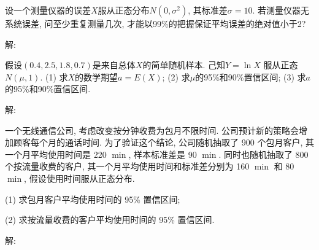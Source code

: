 \documentclass[standard]{ExBook}
\begin{document}
\begin{qitems}
\vspace{-5em}

    \begin{bbox}
    \begin{shaded}
        \qitem
设一个测量仪器的误差$X$服从正态分布$N(0,\sigma^2)$, 其标准差$\sigma = 10$. 若测量仪器无系统误差, 问至少重复测量几次, 才能以99\%的把握保证平均误差的绝对值小于2?
    \end{shaded}
    \end{bbox}

\vspace{-5em}

    \begin{bbox}
解: 
    \end{bbox}

\vspace{-5em}

    \begin{bbox}
    \begin{shaded}
        \qitem
假设$(0.4,2.5,1.8,0.7)$是来自总体$X$的简单随机样本. 己知$Y = \ln X$ 服从正态$N(\mu,1)$.
(1) 求$X$的数学期望$a = E(X)$;
(2) 求$\mu$的95\%和90\%置信区间;
(3) 求$a$的95\%和90\%置信区间.
    \end{shaded}
    \end{bbox}

\vspace{-5em}

    \begin{bbox}
解: 
    \end{bbox}

\vspace{-5em}

    \begin{bbox}
    \begin{shaded}
        \qitem
一个无线通信公司, 考虑改变按分钟收费为包月不限时间. 公司预计新的策略会增加顾客每个月的通话时间. 为了验证这个结论, 公司随机抽取了 900 个包月客户, 其一个月平均使用时间是 220 $\min$, 样本标准差是 90 $\min$. 同时也随机抽取了 800 个按流量收费的客户, 其一个月平均使用时间和标准差分别为 160 $\min$ 和 80 $\min$, 假设使用时间服从正态分布.

(1) 求包月客户平均使用时间的 95\% 置信区间;

(2) 求按流量收费的客户平均使用时间的 95\% 置信区间.
    \end{shaded}
    \end{bbox}

\vspace{-5em}

    \begin{bbox}
解: 
    \end{bbox}


\end{qitems}
\end{document}
